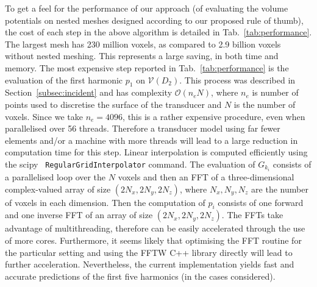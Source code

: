 \documentclass[11pt]{article}
\numberwithin{equation}{section}
\begin{document}
To get a feel for the performance of our approach (of evaluating the volume potentials
on nested meshes designed according to our proposed rule of thumb), the cost of each 
step in the above algorithm is detailed in Tab.~\ref{tab:performance}. The 
largest mesh has 230 million voxels, as compared to 2.9 billion voxels without 
nested meshing. This represents a large saving, in both time and memory. The 
most expensive step reported in Tab.~\ref{tab:performance} is the evaluation of 
the first harmonic $p_1$ on $\mathcal{V}(D_2)$. This process was described in 
Section~\ref{subsec:incident} and has complexity $\mathcal{O}(n_e N)$, where $n_e$ is 
number of points used to discretise the surface of the transducer and $N$ is the 
number of voxels.
Since we take $n_e=4096$, this is a rather expensive procedure, even when parallelised
over 56 threads. Therefore a transducer model using far fewer elements and/or a machine
with more threads will lead to a large reduction in computation time for this step.
Linear interpolation is computed efficiently using the scipy~\cite{jones2001scipy} \verb!RegularGridInterpolator!
command. The evaluation of $G_{k_i}$ consists of a parallelised loop over the 
$N$ voxels and then an FFT of a three-dimensional complex-valued array of size $(2N_x,2N_y,2N_z)$,
where $N_x,N_y,N_z$ are the number of voxels in each dimension. Then the computation
of $p_i$ consists of one forward and one inverse FFT of an array of size $(2N_x,2N_y,2N_z)$.
The FFTs take advantage of multithreading, therefore can be easily accelerated 
through the use of more cores. Furthermore, it seems likely that optimising the 
FFT routine for the particular setting and using the FFTW C++ library directly 
will lead to further acceleration. Nevertheless, the current implementation yields fast and accurate predictions of 
the first five harmonics (in the cases considered).
\end{document}
